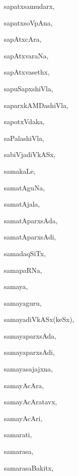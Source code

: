 \begin{multicols}{3}
{\noindent
{sapatxsamudarx}, \pageref{sapatxsamudarx}

\noindent
{sapatxsoVpAna}, \pageref{sapatxsoVpAna}

\noindent
{sapAtxcAra}, \pageref{sapAtxcAra}

\noindent
{sapAtxvaraNa}, \pageref{sapAtxvaraNa}

\noindent
{sapAtxvasethx}, \pageref{sapAtxvasethx}

\noindent
{sapuSapxshiVla}, \pageref{sapuSapxshiVla}

\noindent
{saparxkAMDashiVla}, \pageref{saparxkAMDashiVla}

\noindent
{sapotxVdaka}, \pageref{sapotxVdaka}

\noindent
{saPalashiVla}, \pageref{saPalashiVla}

\noindent
{sabiVjadiVkASx}, \pageref{sabiVjadiVkASx}

\noindent
{samakaLe}, \pageref{samakaLe}

\noindent
{samatAguNa}, \pageref{samatAguNa}

\noindent
{samatAjala}, \pageref{samatAjala}

\noindent
{samatAparxsAda}, \pageref{samatAparxsAda}

\noindent
{samatAparxsAdi}, \pageref{samatAparxsAdi}

\noindent
{samadaqSiTx}, \pageref{samadaqSiTx}

\noindent
{samapaRNa}, \pageref{samapaRNa}

\noindent
{samaya}, \pageref{samaya}

\noindent
{samayaguru}, \pageref{samayaguru}

\noindent
{samayadiVkASx(keSx)}, \pageref{samayadiVkASxkeSx}

\noindent
{samayaparxsAda}, \pageref{samayaparxsAda}

\noindent
{samayaparxsAdi}, \pageref{samayaparxsAdi}

\noindent
{samayasajajxna}, \pageref{samayasajajxna}

\noindent
{samayAcAra}, \pageref{samayAcAra}

\noindent
{samayAcAratavx}, \pageref{samayAcAratavx}

\noindent
{samayAcAri}, \pageref{samayAcAri}

\noindent
{samarati}, \pageref{samarati}

\noindent
{samarasa}, \pageref{samarasa}

\noindent
{samarasaBakitx}, \pageref{samarasaBakitx}

}
\end{multicols}

